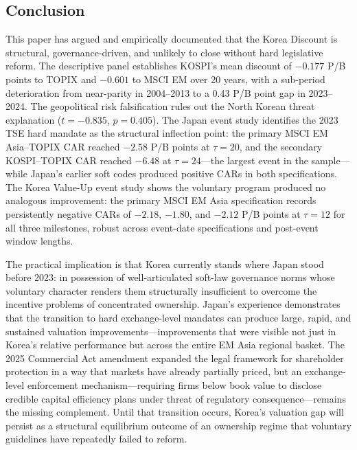 \subsection{Conclusion}

This paper has argued and empirically documented that the Korea Discount is structural, governance-driven, and unlikely to close without hard legislative reform. The descriptive panel establishes KOSPI's mean discount of $-0.177$ P/B points to TOPIX and $-0.601$ to MSCI EM over 20 years, with a sub-period deterioration from near-parity in 2004--2013 to a 0.43 P/B point gap in 2023--2024. The geopolitical risk falsification rules out the North Korean threat explanation ($t = -0.835$, $p = 0.405$). The Japan event study identifies the 2023 TSE hard mandate as the structural inflection point: the primary MSCI EM Asia--TOPIX CAR reached $-2.58$ P/B points at $\tau = 20$, and the secondary KOSPI--TOPIX CAR reached $-6.48$ at $\tau = 24$---the largest event in the sample---while Japan's earlier soft codes produced positive CARs in both specifications. The Korea Value-Up event study shows the voluntary program produced no analogous improvement: the primary MSCI EM Asia specification records persistently negative CARs of $-2.18$, $-1.80$, and $-2.12$ P/B points at $\tau = 12$ for all three milestones, robust across event-date specifications and post-event window lengths.

The practical implication is that Korea currently stands where Japan stood before 2023: in possession of well-articulated soft-law governance norms whose voluntary character renders them structurally insufficient to overcome the incentive problems of concentrated ownership. Japan's experience demonstrates that the transition to hard exchange-level mandates can produce large, rapid, and sustained valuation improvements---improvements that were visible not just in Korea's relative performance but across the entire EM Asia regional basket. The 2025 Commercial Act amendment expanded the legal framework for shareholder protection in a way that markets have already partially priced, but an exchange-level enforcement mechanism---requiring firms below book value to disclose credible capital efficiency plans under threat of regulatory consequence---remains the missing complement. Until that transition occurs, Korea's valuation gap will persist as a structural equilibrium outcome of an ownership regime that voluntary guidelines have repeatedly failed to reform.
